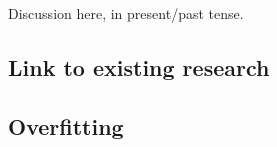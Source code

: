 Discussion here, in present/past tense.


\subsection{Link to existing research}

\subsection{Overfitting}
